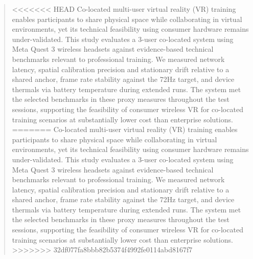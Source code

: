 \begin{abstract}
<<<<<<< HEAD
  Co-located multi-user virtual reality (VR) training enables participants to share physical space while collaborating in virtual environments, yet its technical feasibility using consumer hardware remains under-validated. This study evaluates a 3-user co-located system using Meta Quest 3 wireless headsets against evidence-based technical benchmarks relevant to professional training. We measured network latency, spatial calibration precision and stationary drift relative to a shared anchor, frame rate stability against the 72Hz target, and device thermals via battery temperature during extended runs. The system met the selected benchmarks in these proxy measures throughout the test sessions, supporting the feasibility of consumer wireless VR for co-located training scenarios at substantially lower cost than enterprise solutions.
=======
Co-located multi-user virtual reality (VR) training enables participants to share physical space while collaborating in virtual environments, yet its technical feasibility using consumer hardware remains under-validated. This study evaluates a 3-user co-located system using Meta Quest 3 wireless headsets against evidence-based technical benchmarks relevant to professional training. We measured network latency, spatial calibration precision and stationary drift relative to a shared anchor, frame rate stability against the 72Hz target, and device thermals via battery temperature during extended runs. The system met the selected benchmarks in these proxy measures throughout the test sessions, supporting the feasibility of consumer wireless VR for co-located training scenarios at substantially lower cost than enterprise solutions.
>>>>>>> 32df077fa8bbb82b5374f4992fe0114abd8167f7
\end{abstract}
